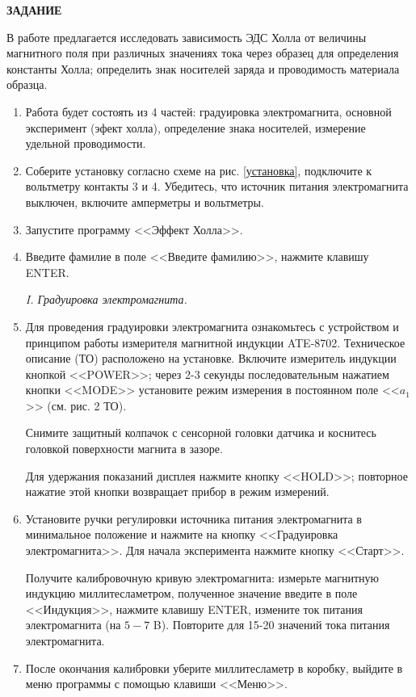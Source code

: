 \documentclass[a4paper,12pt]{article} %
\begin{document}
\begin{center}
\textsf{\textbf{ЗАДАНИЕ}}
\end{center}
В работе предлагается исследовать зависимость ЭДС Холла от величины магнитного поля при различных значениях тока через образец для
определения константы Холла; определить знак носителей заряда и проводимость материала образца.


\begin{enumerate} 
	\item Работа будет состоять из 4 частей: градуировка электромагнита, основной эксперимент (эфект холла), определение знака носителей, измерение удельной проводимости.
  \item Соберите установку согласно схеме на рис. \ref{установка}, подключите к вольтметру контакты 3 и 4. Убедитесь, что источник питания электромагнита выключен, включите амперметры и вольтметры.
  \item Запустите программу <<Эффект Холла>>.
  \item Введите фамилие в поле <<Введите фамилию>>, нажмите клавишу ENTER.
  
\begin{center}
\textit{I. Градуировка электромагнита.}
\end{center}
  
  \item Для проведения градуировки электромагнита ознакомьтесь с устройством и принципом работы измерителя магнитной индукции ATE-8702. Техническое описание (ТО) расположено на установке.
  Включите измеритель индукции кнопкой <<POWER>>; через 2-3 секунды последовательным нажатием кнопки <<MODE>> установите режим измерения в постоянном поле  <<$a_1$>> (см. рис. 2 ТО).
  
  Снимите защитный колпачок с сенсорной головки датчика и коснитесь головкой поверхности магнита в зазоре.
  
  Для удержания показаний дисплея нажмите кнопку <<HOLD>>; повторное нажатие этой кнопки возвращает прибор в режим измерений.
  
  \item Установите ручки регулировки источника питания электромагнита в минимальное положение и нажмите на кнопку <<Градуировка электромагнита>>. Для начала эксперимента нажмите кнопку  <<Старт>>.
  
   Получите калибровочную кривую электромагнита: измерьте магнитную индукцию миллитесламетром, полученное значение введите в поле  <<Индукция>>, нажмите клавишу ENTER, измените ток питания электромагнита (на $5-7$ B). Повторите для 15-20 значений тока питания электромагнита.
   \item После окончания калибровки уберите миллитесламетр в коробку, выйдите в меню программы с помощью клавиши  <<Меню>>.
   

\end{enumerate}
\end{document}
